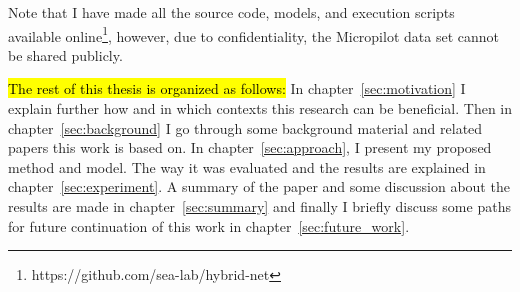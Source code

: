 Note that I have made all the source code, models, and execution scripts available online\footnote{https://github.com/sea-lab/hybrid-net}, however, due to confidentiality, the Micropilot data set cannot be shared publicly. 

\hl{The rest of this thesis is organized as follows:} In chapter~\ref{sec:motivation} I explain further how and in which contexts this research can be beneficial. 
Then in chapter~\ref{sec:background} I go through some background material and related papers this work is based on. 
In chapter~\ref{sec:approach}, I present my proposed method and model. The way it was evaluated and the results are explained in chapter~\ref{sec:experiment}. 
A summary of the paper and some discussion about the results are made in chapter~\ref{sec:summary} and finally I briefly discuss some paths for future continuation of this work in chapter~\ref{sec:future_work}.
